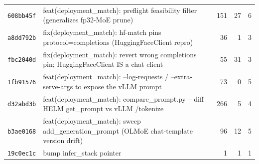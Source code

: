 \begin{longtable}{@{}p{}p{}r r r@{}}
\texttt{608bb45f} & feat(deployment\_match): preflight feasibility filter (generalizes fp32-MoE prune) & 151 & 27 & 6 \\
\texttt{a8dd792b} & fix(deployment\_match): hf-match pins protocol=completions (HuggingFaceClient repro) & 36 & 1 & 3 \\
\texttt{fbc2040d} & fix(deployment\_match): revert wrong completions pin; HuggingFaceClient IS a chat client & 55 & 31 & 3 \\
\texttt{1fb91576} & feat(deployment\_match): --log-requests / --extra-serve-args to expose the vLLM prompt & 73 & 0 & 5 \\
\texttt{d32abd3b} & feat(deployment\_match): compare\_prompt.py -- diff HELM get\_prompt vs vLLM /tokenize & 266 & 5 & 4 \\
\texttt{b3ae0168} & feat(deployment\_match): sweep add\_generation\_prompt (OLMoE chat-template version drift) & 96 & 12 & 5 \\
\texttt{19c0ec1c} & bump infer\_stack pointer & 1 & 1 & 1 \\
\bottomrule\end{longtable}
